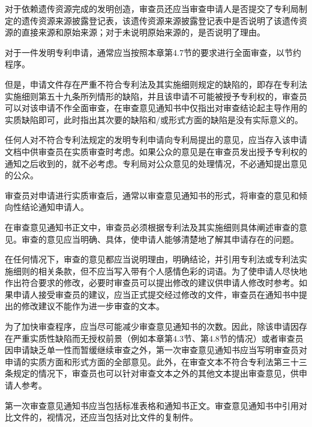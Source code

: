 对于依赖遗传资源完成的发明创造，审查员还应当审查申请人是否提交了专利局制定的遗传资源来源披露登记表，该遗传资源来源披露登记表中是否说明了该遗传资源的直接来源和原始来源；对于未说明原始来源的，是否说明了理由。

对于一件发明专利申请，通常应当按照本章第4.7节的要求进行全面审查，以节约程序。

但是，申请文件存在严重不符合专利法及其实施细则规定的缺陷的，即存在专利法实施细则第五十九条所列情形的缺陷，并且该申请不可能被授予专利权的，审查员可以对该申请不作全面审查，在审查意见通知书中仅指出对审查结论起主导作用的实质缺陷即可，此时指出其次要的缺陷和/或形式方面的缺陷是没有实际意义的。

任何人对不符合专利法规定的发明专利申请向专利局提出的意见，应当存入该申请文档中供审查员在实质审查时考虑。如果公众的意见是在审查员发出授予专利权的通知之后收到的，就不必考虑。专利局对公众意见的处理情况，不必通知提出意见的公众。

审查员对申请进行实质审查后，通常以审查意见通知书的形式，将审查的意见和倾向性结论通知申请人。

在审查意见通知书正文中，审查员必须根据专利法及其实施细则具体阐述审查的意见。审查的意见应当明确、具体，使申请人能够清楚地了解其申请存在的问题。

在任何情况下，审查的意见都应当说明理由，明确结论，并引用专利法或专利法实施细则的相关条款，但不应当写入带有个人感情色彩的词语。为了使申请人尽快地作出符合要求的修改，必要时审查员可以提出修改的建议供申请人修改时参考。如果申请人接受审查员的建议，应当正式提交经过修改的文件，审查员在通知书中提出的修改建议不能作为进一步审查的文本。

为了加快审查程序，应当尽可能减少审查意见通知书的次数。因此，除该申请因存在严重实质性缺陷而无授权前景（例如本章第4.3节、第4.8节的情况）或者审查员因申请缺乏单一性而暂缓继续审查之外，第一次审查意见通知书应当写明审查员对申请的实质方面和形式方面的全部意见。此外，在审查文本不符合专利法第三十三条规定的情况下，审查员也可以针对审查文本之外的其他文本提出审查意见，供申请人参考。

第一次审查意见通知书应当包括标准表格和通知书正文。审查意见通知书中引用对比文件的，视情况，还应当包括对比文件的复制件。

